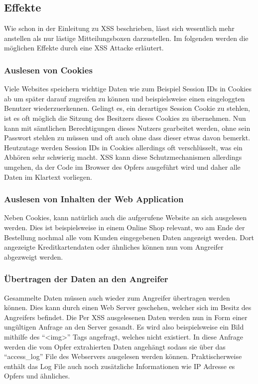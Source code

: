 \subsection{Effekte}
Wie schon in der Einleitung zu XSS beschrieben, l\"asst sich wesentlich mehr anstellen als nur l\"astige Mitteilungsboxen darzustellen. Im folgenden werden die m\"oglichen Effekte durch eine XSS Attacke erl\"autert.
\cite{xssBuch}

\subsubsection{Auslesen von Cookies}
Viele Websites speichern wichtige Daten wie zum Beispiel Session IDs in Cookies ab um sp\"ater darauf zugreifen zu k\"onnen und beispielsweise einen eingeloggten Benutzer wiederzuerkennen. Gelingt es, ein derartiges Session Cookie zu stehlen, ist es oft m\"oglich die Sitzung des Besitzers dieses Cookies zu \"ubernehmen. Nun kann mit s\"amtlichen Berechtigungen dieses Nutzers gearbeitet werden, ohne sein Passwort stehlen zu m\"ussen und oft auch ohne dass dieser etwas davon bemerkt.\\
Heutzutage werden Session IDs in Cookies allerdings oft verschl\"usselt, was ein Abh\"oren sehr schwierig macht. XSS kann diese Schutzmechanismen allerdings umgehen, da der Code im Browser des Opfers ausgef\"uhrt wird und daher alle Daten im Klartext vorliegen.
\cite{xssBuch}

\subsubsection{Auslesen von Inhalten der Web Application}
Neben Cookies, kann nat\"urlich auch die aufgerufene Website an sich ausgelesen werden. Dies ist beispielsweise in einem Online Shop relevant, wo am Ende der Bestellung nochmal alle vom Kunden eingegebenen Daten angezeigt werden. Dort angezeigte Kreditkartendaten oder \"ahnliches k\"onnen nun vom Angreifer abgezweigt werden.
\cite{xssBuch}

\subsubsection{\"Ubertragen der Daten an den Angreifer}
Gesammelte Daten m\"ussen auch wieder zum Angreifer \"ubertragen werden k\"onnen. Dies kann durch einen Web Server geschehen, welcher sich im Besitz des Angreifers befindet. Die Per XSS ausgelesenen Daten werden nun in Form einer ung\"ultigen Anfrage an den Server gesandt. Es wird also beispielsweise ein Bild mithilfe des ``<img>'' Tags angefragt, welches nicht existiert. In diese Anfrage werden die vom Opfer extrahierten Daten angeh\"angt sodass sie \"uber das ``access\_log'' File des Webservers ausgelesen werden k\"onnen. Praktischerweise enth\"alt das Log File auch noch zus\"atzliche Informationen wie IP Adresse es Opfers und \"ahnliches.
\cite{xssBuch}

